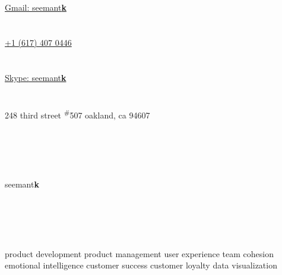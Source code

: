 \documentclass[]{friggeri-cv} %
\begin{document}

\begin{aside} %
\section{\scriptsize {}}
\href{mailto:seemantk@gmail.com}{Gmail: seemant\textbf{k}}
~
\section{\scriptsize {}}
\href{tel:617.407.0446}{+1 (617) 407 0446}
~
\section{\scriptsize {}}
\href{skype:seemantk}{{\color{LightGray}Skype:} seemant\textbf{k}}
~
\section{{\scriptsize {}}}
248 third street
\textsuperscript{\#}507
oakland, ca 94607
~
\section{\href{http://www.github.com/seemantk}{{\scriptsize {}}} ~ \href{http://www.twitter.com/seemantk}{{\scriptsize {}}} ~ \href{http://www.linkedin.com/in/seemantk}{{\scriptsize {}}}}
seemant\textbf{k}
~
~
\section{{\scriptsize {} ~~ }}
product development
product management
user experience
team cohesion
emotional intelligence
customer success
customer loyalty
data visualization
\end{aside}
\end{document}
